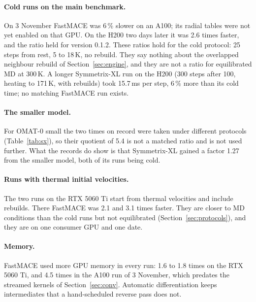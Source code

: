 \documentclass[11pt]{article}
\newcommand{\ms}{\,ms}
\begin{document}
\paragraph{Cold runs on the main benchmark.}
On 3 November FastMACE was 6\,\% slower on an A100; its radial tables were not yet enabled on that GPU. On the
H200 two days later it was 2.6 times faster, and the ratio held for version 0.1.2. These ratios hold for the
cold protocol: 25 steps from rest, 5 to 18\,K, no rebuild. They say nothing about the overlapped neighbour
rebuild of Section~\ref{sec:engine}, and they are not a ratio for equilibrated MD at 300\,K. A longer
Symmetrix-XL run on the H200 (300 steps after 100, heating to 171\,K, with rebuilds) took 15.7\ms{} per step,
6\,\% more than its cold time; no matching FastMACE run exists.

\paragraph{The smaller model.}
For OMAT-0 small the two times on record were taken under different protocols (Table~\ref{tab:sx}), so their
quotient of 5.4 is not a matched ratio and is not used further. What the records do show is that Symmetrix-XL
gained a factor 1.27 from the smaller model, both of its runs being cold.

\paragraph{Runs with thermal initial velocities.}
The two runs on the RTX 5060 Ti start from thermal velocities and include rebuilds. There FastMACE was 2.1 and
3.1 times faster. They are closer to MD conditions than the cold runs but not equilibrated
(Section~\ref{sec:protocols}), and they are on one consumer GPU and one date.

\paragraph{Memory.}
FastMACE used more GPU memory in every run: 1.6 to 1.8 times on the RTX 5060 Ti, and 4.5 times in the A100 run of
3 November, which predates the streamed kernels of Section~\ref{sec:conv}. Automatic differentiation keeps
intermediates that a hand-scheduled reverse pass does not.
\end{document}

